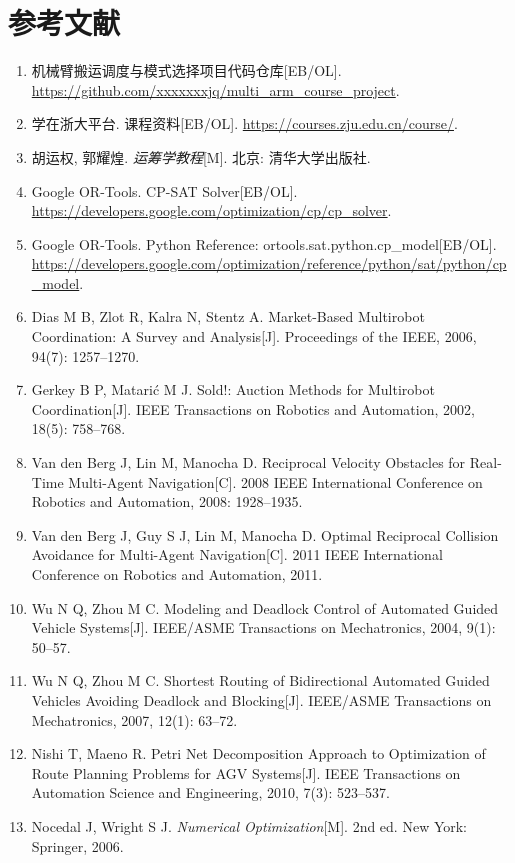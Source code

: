 
\section{参考文献}

\begin{enumerate}
	\renewcommand{\labelenumi}{[\arabic{enumi}]}
	
	\item 机械臂搬运调度与模式选择项目代码仓库[EB/OL].
	\url{https://github.com/xxxxxxxjq/multi_arm_course_project}.


	\item 学在浙大平台. 课程资料[EB/OL].
	\url{https://courses.zju.edu.cn/course/}.
	
	\item 胡运权, 郭耀煌.
	\textit{运筹学教程}[M].
	北京: 清华大学出版社.
	
	\item Google OR-Tools.
	CP-SAT Solver[EB/OL].
	\url{https://developers.google.com/optimization/cp/cp_solver}.
	
	\item Google OR-Tools.
	Python Reference: ortools.sat.python.cp\_model[EB/OL].
	\url{https://developers.google.com/optimization/reference/python/sat/python/cp_model}.
	
	\item Dias M B, Zlot R, Kalra N, Stentz A.
	Market-Based Multirobot Coordination: A Survey and Analysis[J].
	Proceedings of the IEEE, 2006, 94(7): 1257--1270.
	
	\item Gerkey B P, Matarić M J.
	Sold!: Auction Methods for Multirobot Coordination[J].
	IEEE Transactions on Robotics and Automation, 2002, 18(5): 758--768.
	
	\item Van den Berg J, Lin M, Manocha D.
	Reciprocal Velocity Obstacles for Real-Time Multi-Agent Navigation[C].
	2008 IEEE International Conference on Robotics and Automation, 2008: 1928--1935.
	
	\item Van den Berg J, Guy S J, Lin M, Manocha D.
	Optimal Reciprocal Collision Avoidance for Multi-Agent Navigation[C].
	2011 IEEE International Conference on Robotics and Automation, 2011.
	
	\item Wu N Q, Zhou M C.
	Modeling and Deadlock Control of Automated Guided Vehicle Systems[J].
	IEEE/ASME Transactions on Mechatronics, 2004, 9(1): 50--57.
	
	\item Wu N Q, Zhou M C.
	Shortest Routing of Bidirectional Automated Guided Vehicles Avoiding Deadlock and Blocking[J].
	IEEE/ASME Transactions on Mechatronics, 2007, 12(1): 63--72.
	
	\item Nishi T, Maeno R.
	Petri Net Decomposition Approach to Optimization of Route Planning Problems for AGV Systems[J].
	IEEE Transactions on Automation Science and Engineering, 2010, 7(3): 523--537.
	
	\item Nocedal J, Wright S J.
	\textit{Numerical Optimization}[M].
	2nd ed.
	New York: Springer, 2006.
\end{enumerate}

